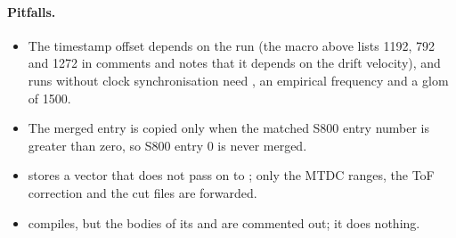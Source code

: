 \paragraph{Pitfalls.}
\begin{itemize}
\item The timestamp offset  depends on the run (the macro above lists 1192, 792 and 1272 in comments
  and notes that it depends on the drift velocity), and runs without clock synchronisation need
  , an empirical frequency and a glom of 1500.
\item The merged entry is copied only when the matched S800 entry number is greater than zero, so S800 entry 0 is
  never merged.
\item {} stores a vector that  does not pass on to ; only the MTDC ranges,
  the ToF correction and the cut files are forwarded.
\item {} compiles, but the bodies of its  and  are commented out; it does
  nothing.
\end{itemize}
